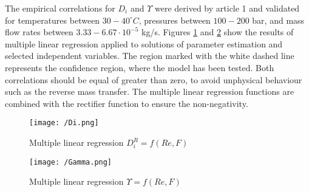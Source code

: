 \documentclass[../Article_Model_Parameters.tex]{subfiles}
\begin{document}
	The empirical correlations for $D_i$ and $\Upsilon$ were derived by {\color{red}article 1} and validated for temperatures between $30 - 40^\circ C$, pressures between $100 - 200$ bar, and mass flow rates between $3.33-6.67 \cdot 10^{-5}$ kg/s. Figures \ref{fig:Correlation_Di} and \ref{fig:Correlation_Gamma} show the results of multiple linear regression applied to solutions of parameter estimation and selected independent variables. The region marked with the white dashed line represents the confidence region, where the model has been tested. Both correlations should be equal of greater than zero, to avoid unphysical behaviour such as the reverse mass transfer. The multiple linear regression functions are combined with the rectifier function to ensure the non-negativity.
	
	\begin{figure}[!ht]
		\centering
		\texttt{[image: /Di.png]}
		\caption{Multiple linear regression $D_i^R = f(Re, F)$}
		\label{fig:Correlation_Di}
	\end{figure}
	
	\begin{figure}[!ht]
		\centering
		\texttt{[image: /Gamma.png]}
		\caption{Multiple linear regression $\Upsilon = f(Re, F)$}
		\label{fig:Correlation_Gamma}
	\end{figure}
				
\end{document}
